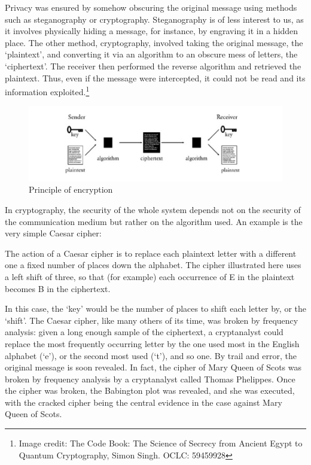 \documentclass{article}
\begin{document}
Privacy was ensured by somehow obscuring the original message using methods such as steganography or
cryptography. Steganography is of less interest to us, as it involves physically hiding a message,
for instance, by engraving it in a hidden place. The other method, cryptography, involved taking the
original message, the `plaintext', and converting it via an algorithm to an obscure mess of letters,
the `ciphertext'. The receiver then performed the reverse algorithm and retrieved the plaintext.
Thus, even if the message were intercepted, it could not be read and its information exploited.\footnote{Image
credit: The Code Book: The Science of Secrecy from Ancient Egypt to Quantum Cryptography, Simon
Singh. OCLC: 59459928}

\begin{figure}[h]
  \centering
  \includegraphics[scale=0.3]{cryp.png}
  \caption{Principle of encryption}
\end{figure}

In cryptography, the security of the whole system depends not on the security of the communication
medium but rather on the algorithm used. An example is the very simple Caesar cipher\cite{caesar}:

\begin{displayquote}
  The action of a Caesar cipher is to replace each plaintext letter with a different one a fixed
number of places down the alphabet. The cipher illustrated here uses a left shift of three, so that
(for example) each occurrence of E in the plaintext becomes B in the ciphertext.
\end{displayquote}

In this case, the `key' would be the number of places to shift each letter by, or the `shift'. The
Caesar cipher, like many others of its time, was broken by frequency analysis: given a long enough
sample of the ciphertext, a cryptanalyst could replace the most frequently occurring letter by the
one used most in the English alphabet (`e'), or the second most used (`t'), and so one. By trail and
error, the original message is soon revealed. In fact, the cipher of Mary Queen of Scots was broken
by frequency analysis by a cryptanalyst called Thomas Phelippes. Once the cipher was broken, the
Babington plot was revealed, and she was executed, with the cracked cipher being the central
evidence in the case against Mary Queen of Scots.
\end{document}
